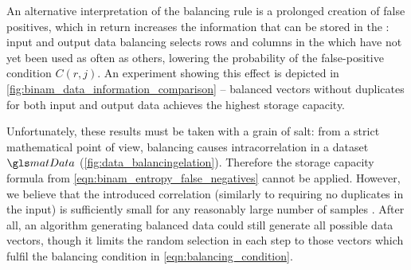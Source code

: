 An alternative interpretation of the balancing rule is a prolonged creation of false positives, which in return increases the information that can be stored in the \BiNAM: input and output data balancing selects rows and columns in the \BiNAM which have not yet been used as often as others, lowering the probability of the false-positive condition $C(r, j)$. An experiment showing this effect is depicted in \cref{fig:binam_data_information_comparison} -- balanced vectors without duplicates for both input and output data achieves the highest \BiNAM storage capacity.

Unfortunately, these results must be taken with a grain of salt: from a strict mathematical point of view, balancing causes intracorrelation in a dataset $\matData$ (\cref{fig:data_balancingelation}). Therefore the storage capacity formula from \cref{eqn:binam_entropy_false_negatives} cannot be applied. However, we believe that the introduced correlation (similarly to requiring no duplicates in the input) is sufficiently small for any reasonably large number of samples \nSamples. After all, an algorithm generating balanced data could still generate all possible data vectors, though it limits the random selection in each step to those vectors which fulfil the balancing condition in \cref{eqn:balancing_condition}.
